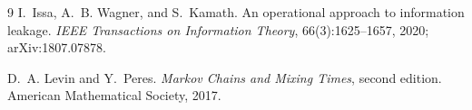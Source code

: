 \documentclass[11pt]{article}
\begin{document}
\begin{thebibliography}{9}\small
{}
I.~Issa, A.~B. Wagner, and S.~Kamath.
\newblock An operational approach to information leakage.
\newblock \emph{IEEE Transactions on Information Theory}, 66(3):1625--1657, 2020; arXiv:1807.07878.

D.~A. Levin and Y.~Peres.
\newblock \emph{Markov Chains and Mixing Times}, second edition.
\newblock American Mathematical Society, 2017.
\end{thebibliography}
\end{document}

